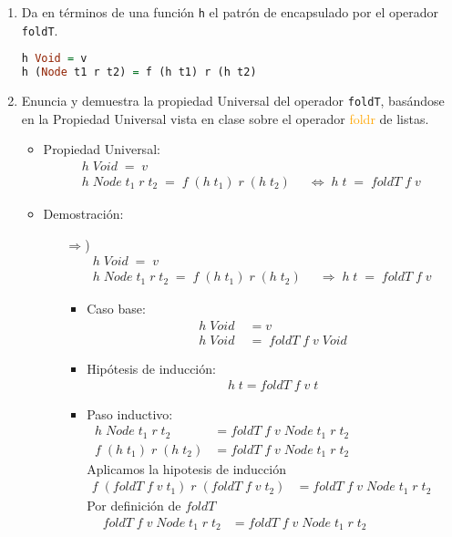\documentclass[spanish,12pt,letterpaper]{article}
\begin{document}
\begin{enumerate}
\item Da en términos de una función \texttt{h} el patrón de encapsulado por el
  operador \texttt{foldT}.
\begin{lstlisting}[language=Haskell]
h Void = v
h (Node t1 r t2) = f (h t1) r (h t2)\end{lstlisting}

\item Enuncia y demuestra la propiedad Universal del operador \texttt{foldT},
  basándose en la Propiedad Universal vista en clase sobre el operador
  \textcolor{orange}{foldr} de listas.
\begin{itemize}
\item Propiedad Universal:\\
\begin{align*}
h\;Void\; = \;v \qquad \qquad \qquad \qquad \;\;\;\;\;\;\\
h\;Node\;t_1\;r\;t_2\;=\;f\;(h\;t_1)\;r\;(h\;t_2)\;&\;\Leftrightarrow\;h\;t\;=\;foldT\;f\;v
\end{align*}
\item Demostración: \\

\begin{itemize}
\item[$\Rightarrow$)]
\begin{align*}
h\;Void\; = \;v \qquad \qquad \qquad \qquad \;\;\;\;\;\;\\
h\;Node\;t_1\;r\;t_2\;=\;f\;(h\;t_1)\;r\;(h\;t_2)\;&\;\Rightarrow\;h\;t\;=\;foldT\;f\;v
\end{align*}

\begin{itemize}
\item Caso base:\\
	\begin{align*}
	h\;Void\;&= v \\
	h\;Void\;&=\;foldT\;f\;v\;Void
	\end{align*}
\item Hipótesis de inducción:
	\begin{align*}
	h\;t=foldT\;f\;v\;t
	\end{align*}
\item Paso inductivo:
\begin{align*}
h\;Node\;t_1\;r\;t_2 &=foldT\;f\;v\;Node\;t_1\;r\;t_2\\
f\;(h\;t_1)\;r\;(h\;t_2) &=foldT\;f\;v\;Node\;t_1\;r\;t_2
\qquad \qquad\qquad\qquad
\end{align*}
Aplicamos la hipotesis de inducción
\begin{align*}
f\;(foldT\;f\;v\;t_1)\;r\;(foldT\;f\;v\;t_2)&=foldT\;f\;v\;Node\;t_1\;r\;t_2\qquad\qquad\qquad\qquad
\end{align*}
Por definición de $foldT$
\begin{align*}
foldT\;f\;v\;Node\;t_1\;r\;t_2&=foldT\;f\;v\;Node\;t_1\;r\;t_2\qquad\qquad\qquad
\end{align*}
\end{itemize}


\end{itemize}
\end{itemize}
\end{enumerate}
\end{document}
